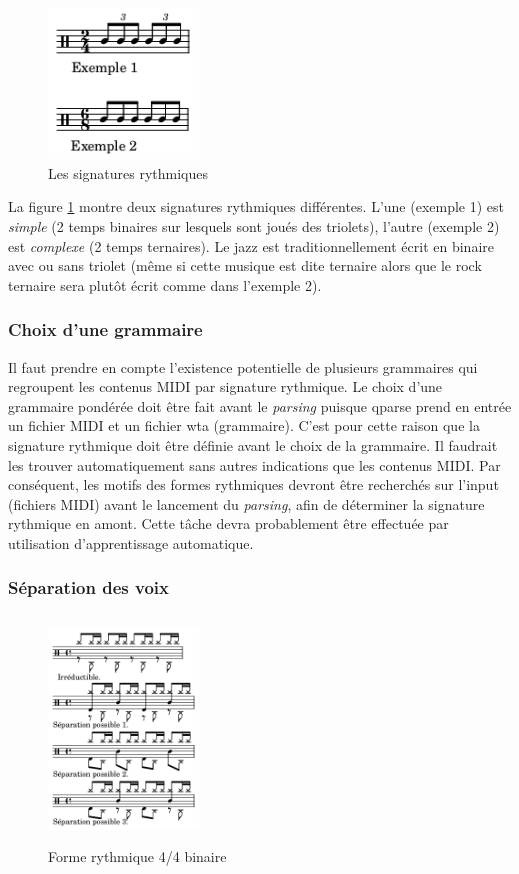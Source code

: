 \begin{figure}[h]
	\centering
	\includegraphics[height=40mm, width=40mm]{
    z_images/3_methodes/2_systemes/0_simple_VS_complexe.png}
	\caption{Les signatures rythmiques}
	\label{subdivisions}
\end{figure} %

La figure \ref{subdivisions} montre deux signatures rythmiques différentes. 
L’une (exemple 1) est \textit{simple} (2 temps binaires sur lesquels sont joués
des triolets), l’autre (exemple 2) est \textit{complexe} (2 temps ternaires). 
Le jazz est traditionnellement écrit en binaire avec ou sans triolet (même si
cette musique est dite ternaire alors que le rock ternaire sera plutôt écrit
comme dans l’exemple 2).

\subsubsection{Choix d’une grammaire}
Il faut prendre en compte l’existence potentielle de plusieurs grammaires
qui regroupent les contenus MIDI par signature rythmique. Le choix d’une
grammaire pondérée doit être fait avant le \textit{parsing} puisque qparse prend en
entrée un fichier MIDI et un fichier wta (grammaire). C’est pour cette raison
que la signature rythmique doit être définie avant le choix de la grammaire.
Il faudrait les trouver automatiquement sans autres indications que les
contenus MIDI. Par conséquent, les motifs des
formes rythmiques devront être recherchés sur l’input (fichiers MIDI)
avant le lancement du \textit{parsing}, afin de déterminer la signature rythmique en
amont. Cette tâche devra probablement être effectuée par utilisation
d’apprentissage automatique.


\subsubsection{Séparation des voix}

\label{sys_sep_voix}
\begin{figure}[h]
	\centering
	\includegraphics[height=60mm, width=40mm]{
    z_images/3_methodes/2_systemes/1_separation_4-4_binaire.png}
	\caption{Forme rythmique 4/4 binaire}
	\label{binaire}
\end{figure}


